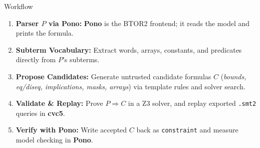 \documentclass[aspectratio=169,xcolor=dvipsnames]{beamer}
\begin{document}
\begin{frame}{Workflow}

  \centering

  \vspace{0.8em}

  \begin{enumerate}
      \setlength\itemsep{0.4em}
    \item \textbf{Parser $P$ via Pono:} \textbf{Pono} is the BTOR2 frontend; it reads the model and prints the formula.
    \item \textbf{Subterm Vocabulary:} Extract words, arrays, constants, and predicates directly from $P$'s subterms.
    \item \textbf{Propose Candidates:} Generate untrusted candidate formulas $C$ (\emph{bounds, eq/diseq, implications, masks, arrays}) via template rules and solver search.
    \item \textbf{Validate \& Replay:} Prove $P \Rightarrow C$ in a Z3 solver, and replay exported \texttt{.smt2} queries in \textbf{cvc5}.
    \item \textbf{Verify with Pono:} Write accepted $C$ back as \texttt{constraint} and measure model checking in \textbf{Pono}.
  \end{enumerate}

\end{frame}
\end{document}
